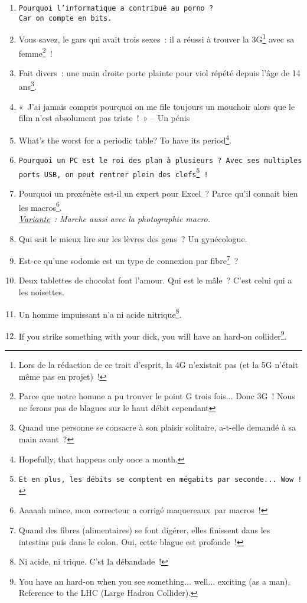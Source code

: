 \documentclass[10pt,a5paper,fullpage]{book}
\begin{document}
\begin{enumerate}
	\item \texttt{Pourquoi l’informatique a contribué au porno~? \\Car on compte en bits.}
	\item Vous savez, le gars qui avait trois sexes~: il a réussi à trouver la 3G\footnote{Lors de la rédaction de ce trait d'esprit, la 4G n'existait pas (et la 5G n'était même pas en projet)~!} avec sa femme\footnote{Parce que notre homme a pu trouver le point G trois fois... Donc 3G~! Nous ne ferons pas de blagues sur le haut débit cependant}~!
	\item Fait divers~: une main droite porte plainte pour viol répété depuis l’âge de 14 ans\footnote{Quand une personne se consacre à son plaisir solitaire, a-t-elle demandé à sa main avant~?}.
	\item «~J’ai jamais compris pourquoi on me file toujours un mouchoir alors que le film n’est absolument pas triste~!~» -- Un pénis
	\item What’s the worst for a periodic table? To have its period\footnote{Hopefully, that happens only once a month.}.
	\item \texttt{Pourquoi un PC est le roi des plan à plusieurs~? Avec ses multiples ports USB, on peut rentrer plein des clefs\footnote{Et en plus, les débits se comptent en mégabits par seconde... Wow~!}~!~}
	\item Pourquoi un proxénète est-il un expert pour Excel~? Parce qu’il connait bien les macros\footnote{Aaaaah mince, mon correcteur a corrigé maquereaux par macros~!}.
	\\ \textit{\underline{Variante}~: Marche aussi avec la photographie macro.}			
	\item Qui sait le mieux lire sur les lèvres des gens~? Un gynécologue.
	\item Est-ce qu'une sodomie est un type de connexion par fibre\footnote{Quand des fibres (alimentaires) se font digérer, elles finissent dans les intestins puis dans le colon. Oui, cette blague est profonde~!}~?
	\item Deux tablettes de chocolat font l’amour. Qui est le mâle~? C’est celui qui a les noisettes. 
	\item Un homme impuissant n’a ni acide nitrique\footnote{Ni acide, ni trique. C'st la débandade~!}.
	\item If you strike something with your dick, you will have an hard-on collider\footnote{You have an hard-on when you see something... well... exciting (as a man). Reference to the LHC (Large Hadron Collider).}. 

\end{enumerate}
\end{document}
